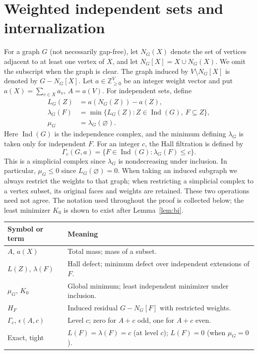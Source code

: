 \documentclass[11pt,a4paper]{article}
\theoremstyle{definition}
\newcommand{\Ind}{\operatorname{Ind}}
\newcommand{\NN}{\mathbb Z_{\geq 0}}
\newcommand{\G}{\Gamma}
\begin{document}
\section{Weighted independent sets and internalization}\label{sec:prelim}
For a graph $G$ (not necessarily gap-free), let $N_G(X)$ denote the set of vertices adjacent to at least one vertex of $X$, and let $N_G[X]=X\cup N_G(X)$. We omit the subscript when the graph is clear. The graph induced by $V\setminus N_G[X]$ is denoted by $G-N_G[X]$. Let $a\in\NN^V$ be an integer weight vector and put $a(X)=\sum_{v\in X}a_v$, $A=a(V)$. For independent sets, define
\begin{align*}
 L_G(Z)&=a(N_G(Z))-a(Z),\\
 \lambda_G(F)&=\min\{L_G(Z): Z\in\Ind(G),\ F\subseteq Z\},\\
 \mu_G&=\lambda_G(\varnothing).
\end{align*}
Here $\Ind(G)$ is the independence complex, and the minimum defining $\lambda_G$ is taken only for independent $F$. For an integer $c$, the Hall filtration is defined by
\[
 \G_c(G,a)=\{F\in\Ind(G):\lambda_G(F)\leq c\}.
\]
This is a simplicial complex since $\lambda_G$ is nondecreasing under inclusion. In particular, $\mu_G\leq0$ since $L_G(\varnothing)=0$. When taking an induced subgraph we always restrict the weights to that graph; when restricting a simplicial complex to a vertex subset, its original faces and weights are retained. These two operations need not agree. The notation used throughout the proof is collected below; the least minimizer $K_0$ is shown to exist after Lemma~\ref{lem:bi}.
\begin{center}
\small
\begin{tabularx}{\linewidth}{@{}lX@{}}
\toprule
Symbol or term & Meaning\\
\midrule
$A$, $a(X)$ & Total mass; mass of a subset.\\
$L(Z)$, $\lambda(F)$ & Hall defect; minimum defect over independent extensions of $F$.\\
$\mu_G$, $K_0$ & Global minimum; least independent minimizer under inclusion.\\
$H_F$ & Induced residual $G-N_G[F]$ with restricted weights.\\
$\Gamma_c$, $\epsilon(A,c)$ & Level $c$; zero for $A+c$ odd, one for $A+c$ even.\\
Exact, tight & $L(F)=\lambda(F)=c$ (at level $c$); $L(F)=0$ (when $\mu_G=0$).\\
\bottomrule
\end{tabularx}
\end{center}
\end{document}
